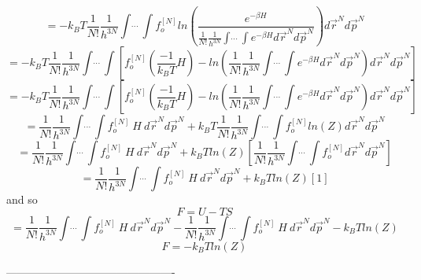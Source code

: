 \documentclass[double,12pt]{beavtex}
\begin{document}
\begin{equation}  =-k_BT\frac{1}{N!}\frac{1}{h^{3N}}\int\dot~\dot~\dot~\int f_o^{[N]}ln\left(\frac{e^{-\beta H}}{\frac{1}{N!}\frac{1}{h^{3N}}\int\dot~\dot~\dot~\int e^{-\beta H} d\vec r^{N} d\vec p^{N}}\right) d\vec r^{N} d\vec p^{N} \end{equation}
\begin{equation}  =-k_BT\frac{1}{N!}\frac{1}{h^{3N}}\int\dot~\dot~\dot~\int \left[f_o^{[N]}\left(\frac{-1}{k_BT}H\right)-ln\left(\frac{1}{N!}\frac{1}{h^{3N}}\int\dot~\dot~\dot~\int e^{-\beta H} d\vec r^{N} d\vec p^{N}\right) d\vec r^{N} d\vec p^{N}\right] \end{equation}
\begin{equation}  =-k_BT\frac{1}{N!}\frac{1}{h^{3N}}\int\dot~\dot~\dot~\int \left[f_o^{[N]}\left(\frac{-1}{k_BT}H\right)-ln\left(\frac{1}{N!}\frac{1}{h^{3N}}\int\dot~\dot~\dot~\int e^{-\beta H} d\vec r^{N} d\vec p^{N}\right) d\vec r^{N} d\vec p^{N}\right] \end{equation}
\begin{equation} = \frac{1}{N!}\frac{1}{h^{3N}}\int\dot~\dot~\dot~\int f_o^{[N]}~H~d\vec r^{N} d\vec p^{N} +k_BT\frac{1}{N!}\frac{1}{h^{3N}}\int\dot~\dot~\dot~\int f_o^{[N]}ln(Z)d\vec r^{N} d\vec p^{N}\end{equation}
\begin{equation} = \frac{1}{N!}\frac{1}{h^{3N}}\int\dot~\dot~\dot~\int f_o^{[N]}~H~d\vec r^{N} d\vec p^{N} +k_BTln(Z)\left[\frac{1}{N!}\frac{1}{h^{3N}}\int\dot~\dot~\dot~\int f_o^{[N]}d\vec r^{N} d\vec p^{N}\right]\end{equation}
\begin{equation} = \frac{1}{N!}\frac{1}{h^{3N}}\int\dot~\dot~\dot~\int f_o^{[N]}~H~d\vec r^{N} d\vec p^{N} +k_BTln(Z)\left[1\right]\end{equation}
and so 
\begin{equation}F = U - TS\end{equation}
\begin{equation} = \frac{1}{N!}\frac{1}{h^{3N}}\int\dot~\dot~\dot~\int f_o^{[N]}~H~d\vec r^{N} d\vec p^{N}-\frac{1}{N!}\frac{1}{h^{3N}}\int\dot~\dot~\dot~\int f_o^{[N]}~H~d\vec r^{N} d\vec p^{N} -k_BTln(Z)\end{equation}
\begin{equation}F = -k_BTln(Z)\end{equation}

----------------------------------------------


\end{document}
